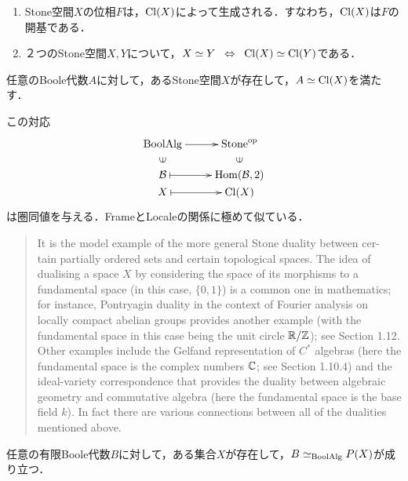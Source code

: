 \documentclass[uplatex, dvipdfmx]{jsreport}
\begin{document}
\begin{lemma}\mbox{}
    \begin{enumerate}
        \item Stone空間$X$の位相$F$は，$\mathrm{Cl}(X)$によって生成される．すなわち，$\mathrm{Cl}(X)$は$F$の開基である．
        \item ２つのStone空間$X,Y$について，$X\simeq Y\;\;\Leftrightarrow\;\;\mathrm{Cl}(X)\simeq\mathrm{Cl}(Y)$である．
    \end{enumerate}
\end{lemma}

\begin{theorem}[Stone表現定理]
    任意のBoole代数$A$に対して，あるStone空間$X$が存在して，$A\simeq\mathrm{Cl}(X)$を満たす．
\end{theorem}
\begin{remarks}
    この対応
    \[\xymatrix@R-2pc{
        \BoolAlg\ar[r]&\Stone^\op\\
        \rotatebox[origin=c]{90}{$\in$}&\rotatebox[origin=c]{90}{$\in$}\\
        \B\ar@{|->}[r]&\Hom(\B,2)\\
        X\ar@{|->}[r]&\Cl(X)
    }\]
    は圏同値を与える．FrameとLocaleの関係に極めて似ている．
    \begin{quote}
        It is the model example of the more general Stone duality between cer- tain partially ordered sets and certain topological spaces.
        The idea of dualising a space $X$ by considering the space of its morphisms to a fundamental space (in this case, $\{0, 1\}$) is a common one in mathematics; for instance, Pontryagin duality in the context of Fourier analysis on locally compact abelian groups provides another example (with the fundamental space in this case being the unit circle $\mathbb{R}/\mathbb{Z}$); see Section 1.12. Other examples include the Gelfand representation of $C^*$ algebras (here the fundamental space is the complex numbers $\mathbb{C}$; see Section 1.10.4) and the ideal-variety correspondence that provides the duality between algebraic geometry and commutative algebra (here the fundamental space is the base field $k$). In fact there are various connections between all of the dualities mentioned above.
    \end{quote}
\end{remarks}

\begin{lemma}[Birkhoff表現定理]
    任意の有限Boole代数$B$に対して，ある集合$X$が存在して，$B\simeq_{\mathrm{BoolAlg}} P(X)$が成り立つ．
\end{lemma}
\end{document}
